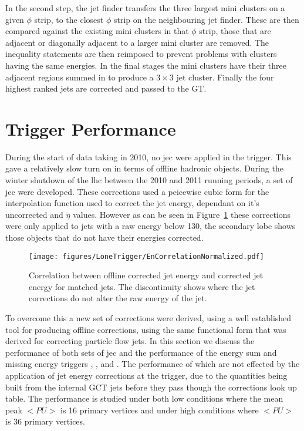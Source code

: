 In the second step, the jet finder transfers the three largest mini clusters on 
a given $\phi$ strip, to the closest $\phi$ strip on the neighbouring jet 
finder. These are then compared against the existing mini clusters in that 
$\phi$ strip, those that are adjacent or diagonally adjacent to a larger mini 
cluster are removed. The inequality statements are then reimposed to prevent 
problems with clusters having the same energies. In the final stages the mini 
clusters have their three adjacent regions summed in to produce a $3 \times 3$ 
jet cluster. Finally the four highest ranked jets are corrected and passed to 
the GT.

\section{\Lone Trigger Performance} %

During the start of data taking in 2010, no \ac{jec} were 
applied in the \Lone trigger. This gave a relatively slow turn on in terms of 
offline hadronic objects.
During the winter shutdown of the \ac{lhc} between the 2010 and 2011 running 
periods, a set of \Lone \ac{jec} were developed. These corrections used a 
peicewise cubic form for the interpolation function used to correct the jet 
energy, dependant on it's uncorrected \ET and $\eta$ values. However as can be 
seen in Figure~\ref{fig:figures_LoneTrigger_EnCorrelationNormalized} these 
corrections were only applied to jets with a raw energy below \unit{130}{\GeV}, 
the secondary lobe shows those objects that do not have their energies 
corrected.

\begin{figure}[htbp]
  \centering
    \texttt{[image: figures/LoneTrigger/EnCorrelationNormalized.pdf]}
  \caption{Correlation between offline corrected jet energy and \Lone corrected jet energy for matched jets. The discontinuity shows where the \Lone jet corrections do not alter the raw energy of the jet.}
  \label{fig:figures_LoneTrigger_EnCorrelationNormalized}
\end{figure}

To overcome this a new set of corrections were derived, using a well established tool for producing offline corrections, 
using the same functional form that was derived for correcting particle flow 
jets\cite{PAS-JME-10-010}.%
In this section we discuss the performance of both sets of \Lone \ac{jec} and 
the performance of the energy sum and missing energy triggers \HT, \HTm, and 
\MET. The performance of which are not effected by the application of jet 
energy corrections at the \Lone trigger, due to the quantities being built from 
the internal GCT jets before they pass though the corrections look up table.
The performance is studied under both low \pu conditions where the mean 
peak \pu $<PU>$ is 16 primary vertices and under high \pu conditions 
where $<PU>$ is 36 primary vertices.

